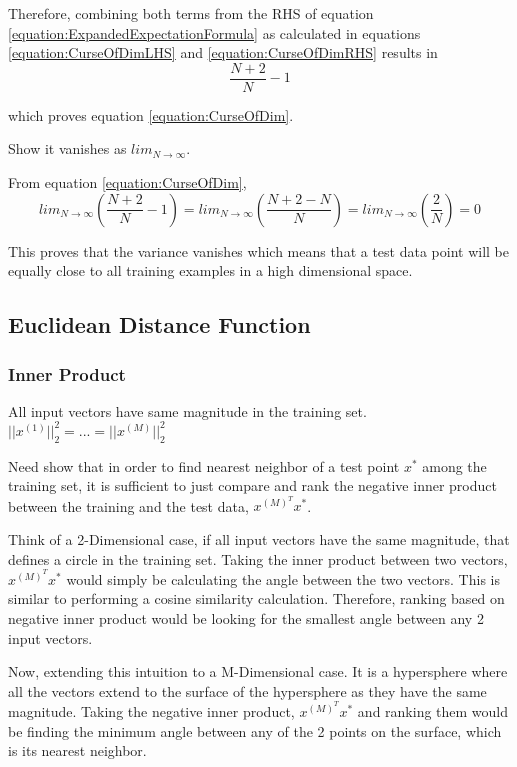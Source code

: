 \documentclass[a4paper,12pt]{article}
\begin{document}
Therefore, combining both terms from the RHS of equation  \ref{equation:ExpandedExpectationFormula} as calculated in equations \ref{equation:CurseOfDimLHS} and \ref{equation:CurseOfDimRHS}  results in 
\begin{equation}
 \frac{N + 2}{N} - 1
\end{equation} 

which proves equation \ref{equation:CurseOfDim}. 

Show it vanishes as $lim_{N\to\infty}$.

From equation \ref{equation:CurseOfDim}, 
\begin{equation}
\label{equation:CurseOfDimVanish}
lim_{N\to\infty} (\frac{N + 2}{N} - 1) = 
lim_{N\to\infty} (\frac{N + 2 - N}{N}) = 
lim_{N\to\infty} (\frac{2}{N}) = 0
\end{equation} 

This proves that the variance vanishes which means that a test data point will be equally close to all training examples in a high dimensional space. 
\subsection{Euclidean Distance Function}
\subsubsection{Inner Product}

All input vectors have same magnitude in the training set. 
$||x^{(1)}||_{2}^{2} = ... = ||x^{(M)}||_{2}^{2}$

Need show that in order to find nearest neighbor of a test point $x^{*}$ among the training set, it is sufficient to just compare and rank the negative inner product between the training and the test data, $x^{(M)^{T}}x^{*}$. 

Think of a 2-Dimensional case, if all input vectors have the same magnitude, that defines a circle in the training set. Taking the inner product between two vectors, $x^{(M)^{T}}x^{*}$ would simply be calculating the angle between the two vectors. This is similar to performing a cosine similarity calculation. Therefore, ranking based on negative inner product would be looking for the smallest angle between any 2 input vectors. 

Now, extending this intuition to a M-Dimensional case. It is a hypersphere where all the vectors extend to the surface of the hypersphere as they have the same magnitude. Taking the negative inner product, $x^{(M)^{T}}x^{*}$ and ranking them would be finding the minimum angle between any of the 2 points on the surface, which is its nearest neighbor. 
\end{document}
